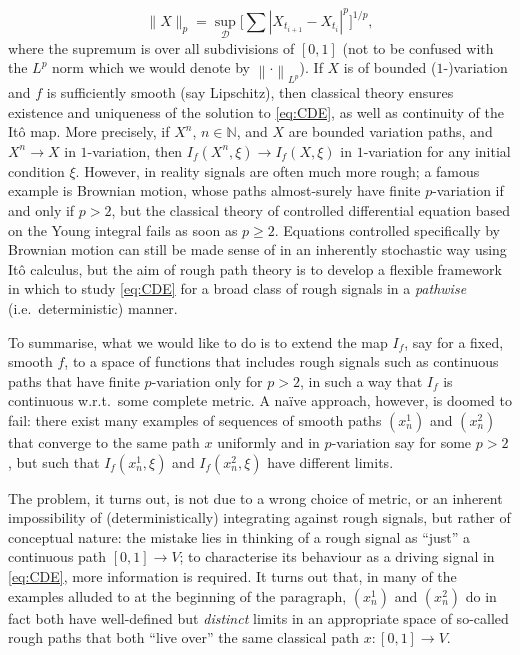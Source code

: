 \documentclass[11pt, letterpaper]{article}
\theoremstyle{definition}
\theoremstyle{remark}
\newcommand{\N}{\mathbb{N}}
\begin{document}
\begin{appendices}
\begin{equation}\label{eq:pvariation}
    \|X\|_{p} = \sup_{\mathcal{D}} \bigg[ \sum |X_{t_{i+1}}-X_{t_i}|^p\bigg]^{1 / p},
\end{equation}
where the supremum is over all subdivisions of $[0,1]$ (not to be confused with the $L^p$ norm which we would denote by $\left\|\cdot\right\|_{L^p}$).
If $X$ is of bounded ($1$-)variation and $f$ is sufficiently smooth (say Lipschitz), then classical theory ensures existence and uniqueness of the solution to \eqref{eq:CDE}, as well as continuity of the It\^o map. More precisely, if $X^n$, $n\in \N$, and $X$ are bounded variation paths, and $X^n \to X$ in $1$-variation, then $I_f(X^n,\xi) \to I_f(X,\xi)$ in $1$-variation for any initial condition $\xi$.
However, in reality signals are often much more rough; a famous example is Brownian motion, whose paths almost-surely have finite $p$-variation if and only if $p > 2$, but the classical theory of controlled differential equation based on the Young integral fails as soon as $p \ge 2$. Equations controlled specifically by Brownian motion can still be made sense of in an inherently stochastic way using It\^o calculus, but the aim of rough path theory is to develop a flexible framework in which to study \eqref{eq:CDE} for a broad class of rough signals in a \emph{pathwise} (i.e.\ deterministic) manner.

To summarise, what we would like to do is to extend the map $I_f$, say for a fixed, smooth $f$, to a space of functions that includes rough signals such as continuous paths that have finite $p$-variation only for $p > 2$, in such a way that $I_f$ is continuous w.r.t.\ some complete metric. A na\"ive approach, however, is doomed to fail: there exist many examples of sequences of smooth paths $(x^1_n)$ and $(x^2_n)$ that converge to the same path $x$ uniformly and in $p$-variation say for some $p > 2$, but such that $I_f(x^1_n,\xi)$ and $I_f(x^2_n,\xi)$ have different limits.

The problem, it turns out, is not due to a wrong choice of metric, or an inherent impossibility of (deterministically) integrating against rough signals, but rather of conceptual nature: the mistake lies in thinking of a rough signal as ``just'' a continuous path $[0,1] \to V$; to characterise its behaviour as a driving signal in \eqref{eq:CDE}, more information is required. It turns out that, in many of the examples alluded to at the beginning of the paragraph, $(x^1_n)$ and $(x^2_n)$ do in fact both have well-defined but \emph{distinct} limits in an appropriate space of so-called rough paths that both ``live over'' the same classical path $x\colon [0,1] \to V$.


\end{appendices}
\end{document}
